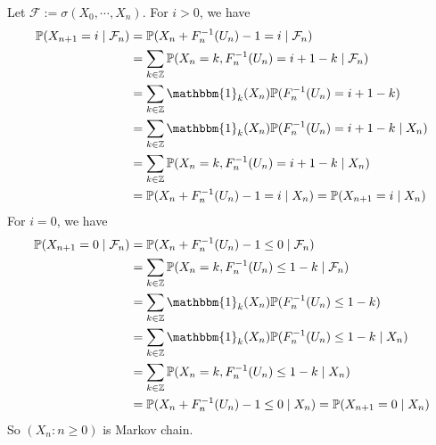 \documentclass{ctexart}
\begin{document}
\begin{solution}
  Let \(\mathcal{F}:=\sigma(X_0,\cdots,X_n)\).
  For \(i > 0\), we have
  \[
    \begin{aligned}
      \mathbb{P}(X_{n+1}=i \mid \mathcal{F}_n)
       & =\mathbb{P}(X_n+F^{-1}_n(U_n)-1=i \mid \mathcal{F}_n)                              \\
       & =\sum_{k \in \mathbb{Z}}\mathbb{P}(X_n=k,F^{-1}_n(U_n)=i+1-k \mid \mathcal{F}_n)   \\
       & =\sum_{k \in \mathbb{Z}}\mathbbm{1}_k(X_n)\mathbb{P}(F^{-1}_n(U_n)=i+1-k)          \\
       & =\sum_{k \in \mathbb{Z}}\mathbbm{1}_k(X_n)\mathbb{P}(F^{-1}_n(U_n)=i+1-k \mid X_n) \\
       & =\sum_{k \in \mathbb{Z}}\mathbb{P}(X_n=k,F^{-1}_n(U_n)=i+1-k \mid X_n)             \\
       & =\mathbb{P}(X_n+F^{-1}_n(U_n)-1=i \mid X_n) =\mathbb{P}(X_{n+1} =i \mid X_n)       \\
    \end{aligned}
  \]
  For \(i=0\), we have
  \[
    \begin{aligned}
      \mathbb{P}(X_{n+1}=0 \mid \mathcal{F}_n)
       & =\mathbb{P}(X_n+F^{-1}_n(U_n)-1\leq 0 \mid \mathcal{F}_n)                            \\
       & =\sum_{k \in \mathbb{Z}}\mathbb{P}(X_n=k,F^{-1}_n(U_n)\leq 1-k \mid \mathcal{F}_n)   \\
       & =\sum_{k \in \mathbb{Z}}\mathbbm{1}_k(X_n)\mathbb{P}(F^{-1}_n(U_n)\leq 1-k)          \\
       & =\sum_{k \in \mathbb{Z}}\mathbbm{1}_k(X_n)\mathbb{P}(F^{-1}_n(U_n)\leq 1-k \mid X_n) \\
       & =\sum_{k \in \mathbb{Z}}\mathbb{P}(X_n=k,F^{-1}_n(U_n)\leq 1-k \mid X_n)             \\
       & =\mathbb{P}(X_n+F^{-1}_n(U_n)-1\leq 0 \mid X_n) =\mathbb{P}(X_{n+1} = 0 \mid X_n)    \\
    \end{aligned}
  \]
  So \((X_n:n \geq 0)\) is Markov chain.
\end{solution}
\end{document}
